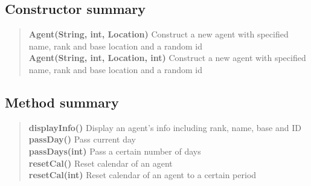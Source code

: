 {{\subsection{Constructor summary}{
\begin{verse}
{\bf Agent(String, int, Location)} Construct a new agent with specified name, rank and base location and a random id\\
{\bf Agent(String, int, Location, int)} Construct a new agent with specified name, rank and base location and a random id\\
\end{verse}
}
\subsection{Method summary}{
\begin{verse}
{\bf displayInfo()} Display an agent's info including rank, name, base and ID\\
{\bf passDay()} Pass current day\\
{\bf passDays(int)} Pass a certain number of days\\
{\bf resetCal()} Reset calendar of an agent\\
{\bf resetCal(int)} Reset calendar of an agent to a certain period\\
\end{verse}
}
}}
